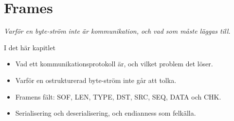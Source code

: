 \chapter{Frames}
\label{ch:frames}


{\large\itshape Varför en byte-ström inte är kommunikation, och vad som måste läggas till.\par}

\begin{chapterbox}{I det här kapitlet}
\begin{itemize}
  \item Vad ett kommunikationsprotokoll är, och vilket problem det löser.
  \item Varför en ostrukturerad byte-ström inte går att tolka.
  \item Framens fält: SOF, LEN, TYPE, DST, SRC, SEQ, DATA och CHK.
  \item Serialisering och deserialisering, och endianness som felkälla.
\end{itemize}
\end{chapterbox}





